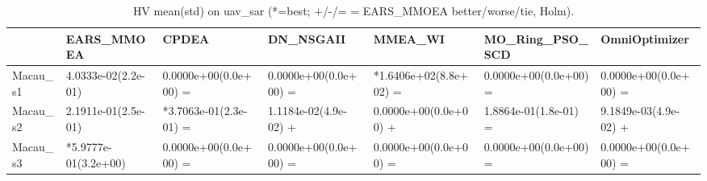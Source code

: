 \begin{table}[t]
\centering
\caption{HV mean(std) on uav_sar (*=best; +/-/= = EARS_MMOEA better/worse/tie, Holm).}
\label{tab:uav_sar_HV}
\begin{tabular}{lllllll}
\toprule
 & EARS\_MMOEA & CPDEA & DN\_NSGAII & MMEA\_WI & MO\_Ring\_PSO\_SCD & OmniOptimizer \\
\midrule
Macau\_s1 & 4.0333e-02(2.2e-01) & 0.0000e+00(0.0e+00) = & 0.0000e+00(0.0e+00) = & *1.6406e+02(8.8e+02) = & 0.0000e+00(0.0e+00) = & 0.0000e+00(0.0e+00) = \\
Macau\_s2 & 2.1911e-01(2.5e-01) & *3.7063e-01(2.3e-01) = & 1.1184e-02(4.9e-02) + & 0.0000e+00(0.0e+00) + & 1.8864e-01(1.8e-01) = & 9.1849e-03(4.9e-02) + \\
Macau\_s3 & *5.9777e-01(3.2e+00) & 0.0000e+00(0.0e+00) = & 0.0000e+00(0.0e+00) = & 0.0000e+00(0.0e+00) = & 0.0000e+00(0.0e+00) = & 0.0000e+00(0.0e+00) = \\
\bottomrule
\end{tabular}
\end{table}
